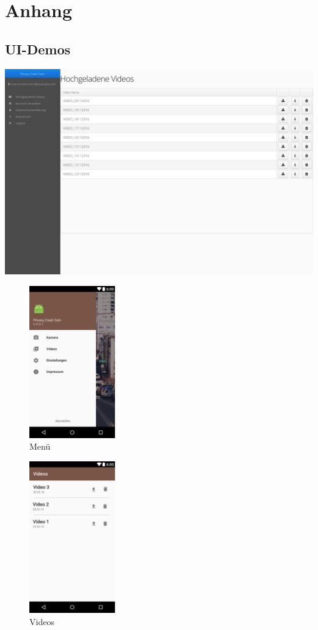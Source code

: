 \chapter{Anhang}
\section{UI-Demos}
\includegraphics[width=1\textwidth]{subtopicsFuncspec/Res/UI-Demos/Webinterface.png}
\begin{figure}
	\centering
	\includegraphics[width=0.33\textwidth]{subtopicsFuncspec/Res/Mockups/Portrait_camera_view_menu.png}
	\caption{Menü}
\end{figure}
\begin{figure}
	\centering
	\includegraphics[width=0.33\textwidth]{subtopicsFuncspec/Res/Mockups/Videos_list1.png}
	\caption{Videos}
\end{figure}
